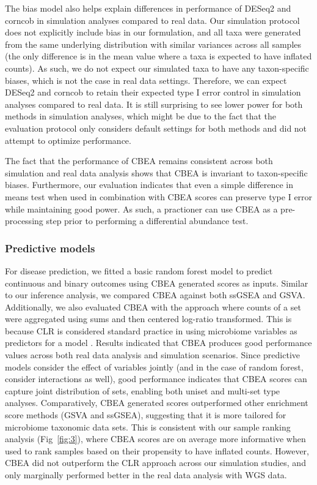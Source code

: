 \documentclass[10pt,letterpaper]{article}
\begin{document}
The bias model also helps explain differences in performance of DESeq2 and corncob in simulation analyses compared to real data. Our simulation protocol does not explicitly include bias in our formulation, and all taxa were generated from the same underlying distribution with similar variances across all samples (the only difference is in the mean value where a taxa is expected to have inflated counts). As such, we do not expect our simulated taxa to have any taxon-specific biases, which is not the case in real data settings. Therefore, we can expect DESeq2 and corncob to retain their expected type I error control in simulation analyses compared to real data. It is still surprising to see lower power for both methods in simulation analyses, which might be due to the fact that the evaluation protocol only considers default settings for both methods and did not attempt to optimize performance. 

The fact that the performance of CBEA remains consistent across both simulation and real data analysis shows that CBEA is invariant to taxon-specific biases. Furthermore, our evaluation indicates that even a simple difference in means test when used in combination with CBEA scores can preserve type I error while maintaining good power. As such, a practioner can use CBEA as a pre-processing step prior to performing a differential abundance test.  

\subsubsection*{Predictive models}
For disease prediction, we fitted a basic random forest model \cite{breiman2001} to predict continuous and binary outcomes using CBEA generated scores as inputs. Similar to our inference analysis, we compared CBEA against both ssGSEA and GSVA. Additionally, we also evaluated CBEA with the approach where counts of a set were aggregated using sums and then centered log-ratio transformed. This is because CLR is considered standard practice in using microbiome variables as predictors for a model \cite{gloor2017}. Results indicated that CBEA produces good performance values across both real data analysis and simulation scenarios. Since predictive models consider the effect of variables jointly (and in the case of random forest, consider interactions as well), good performance indicates that CBEA scores can capture joint distribution of sets, enabling both uniset and multi-set type analyses. Comparatively, CBEA generated scores outperformed other enrichment score methods (GSVA and ssGSEA), suggesting that it is more tailored for microbiome taxonomic data sets. This is consistent with our sample ranking analysis (Fig~\ref{fig:3}), where CBEA scores are on average more informative when used to rank samples based on their propensity to have inflated counts. However, CBEA did not outperform the CLR approach across our simulation studies, and only marginally performed better in the real data analysis with WGS data. 
\end{document}
